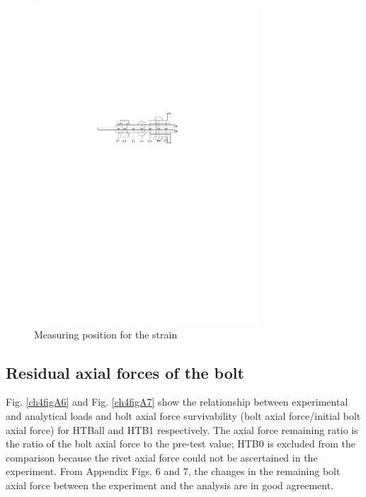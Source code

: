 \begin{figure}
    \centering
    \includegraphics[width=0.75\textwidth]{imgs/ch4/figA5.pdf}
    \caption{Measuring position for the strain}
    \label{ch4figA5}
\end{figure}

\subsection{Residual axial forces of the bolt}

Fig. \ref{ch4figA6} and Fig. \ref{ch4figA7} show the relationship between experimental and analytical loads and bolt axial force survivability (bolt axial force/initial bolt axial force) for HTBall and HTB1 respectively. The axial force remaining ratio is the ratio of the bolt axial force to the pre-test value; HTB0 is excluded from the comparison because the rivet axial force could not be ascertained in the experiment.
From Appendix Figs. 6 and 7, the changes in the remaining bolt axial force between the experiment and the analysis are in good agreement.

